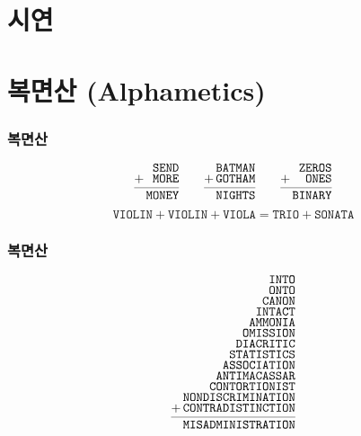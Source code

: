 \documentclass{beamer}
\begin{document}
%
\section*{시연}

\section{복면산 (Alphametics)}

%
\begin{frame}
  \frametitle{복면산}
  {\LARGE
  \[
  \def\arraystretch{0.7}
  \begin{array}{c@{\,}r}
    & \texttt{SEND} \\
    + & \texttt{MORE} \\
    \cmidrule(lr){1-2}
    & \texttt{MONEY}
  \end{array}
  \quad
  \def\arraystretch{0.7}
  \begin{array}{c@{\,}r}
    & \texttt{BATMAN} \\
    + & \texttt{GOTHAM} \\
    \cmidrule(lr){1-2}
    & \texttt{NIGHTS}
  \end{array}
  \quad
  \begin{array}{c@{\,}r}
    & \texttt{ZEROS} \\
    + & \texttt{ONES} \\
    \cmidrule(lr){1-2}
    & \texttt{BINARY}
  \end{array}
  \]
  }
  \vspace{5mm}
  {\Large
    \[ \texttt{VIOLIN}+\texttt{VIOLIN}+\texttt{VIOLA}%
    =\texttt{TRIO}+\texttt{SONATA} \]
  }
\end{frame}

%
\begin{frame}
  \frametitle{복면산}
  \[
  \def\arraystretch{0.7}
  \begin{array}{c@{\,}r}
    & \texttt{INTO} \\
    & \texttt{ONTO} \\
    & \texttt{CANON} \\
    & \texttt{INTACT} \\
    & \texttt{AMMONIA} \\
    & \texttt{OMISSION} \\
    & \texttt{DIACRITIC} \\
    & \texttt{STATISTICS} \\
    & \texttt{ASSOCIATION} \\
    & \texttt{ANTIMACASSAR} \\
    & \texttt{CONTORTIONIST} \\
    & \texttt{NONDISCRIMINATION} \\
    + & \texttt{CONTRADISTINCTION} \\
    \cmidrule(lr){1-2}
    & \texttt{MISADMINISTRATION}
  \end{array}
  \]
\end{frame}
\end{document}
